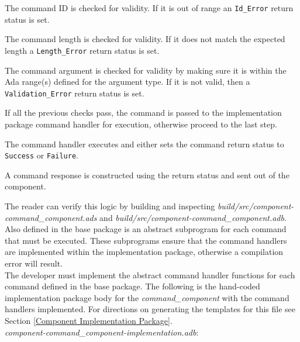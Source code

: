 \vspace{5mm} %
\begin{spacedenumerate}
  \item The command ID is checked for validity. If it is out of range an \texttt{Id\_Error} return status is set.
  \item The command length is checked for validity. If it does not match the expected length a \texttt{Length\_Error} return status is set.
  \item The command argument is checked for validity by making sure it is within the Ada range(s) defined for the argument type. If it is not valid, then a \texttt{Validation\_Error} return status is set.
  \item If all the previous checks pass, the command is passed to the implementation package command handler for execution, otherwise proceed to the last step.
  \item The command handler executes and either sets the command return status to \texttt{Success} or \texttt{Failure}.
  \item A command response is constructed using the return status and sent out of the component.
\end{spacedenumerate}
\vspace{5mm} %

The reader can verify this logic by building and inspecting \textit{build/src/component-command\_component.ads} and \textit{build/src/component-command\_component.adb}. \\

Also defined in the base package is an abstract subprogram for each command that must be executed. These subprograms ensure that the command handlers are implemented within the implementation package, otherwise a compilation error will result. \\

The developer must implement the abstract command handler functions for each command defined in the base package. The following is the hand-coded implementation package body for the \textit{command\_component} with the command handlers implemented. For directions on generating the templates for this file see Section \ref{Component Implementation Package}. \\

\textit{component-command\_component-implementation.adb}:

